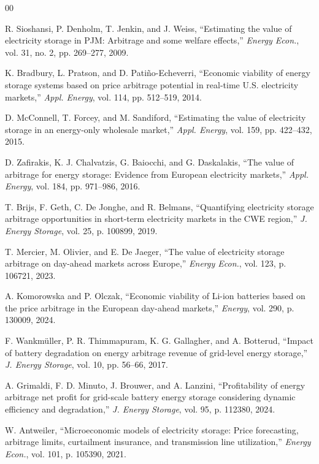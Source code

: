 \documentclass[conference,a4paper]{IEEEtran}
\begin{document}
\begin{thebibliography}{00}

 R. Sioshansi, P. Denholm, T. Jenkin, and J. Weiss, ``Estimating the value of electricity storage in PJM: Arbitrage and some welfare effects,'' \textit{Energy Econ.}, vol. 31, no. 2, pp. 269--277, 2009.

 K. Bradbury, L. Pratson, and D. Pati\~no-Echeverri, ``Economic viability of energy storage systems based on price arbitrage potential in real-time U.S. electricity markets,'' \textit{Appl. Energy}, vol. 114, pp. 512--519, 2014.

 D. McConnell, T. Forcey, and M. Sandiford, ``Estimating the value of electricity storage in an energy-only wholesale market,'' \textit{Appl. Energy}, vol. 159, pp. 422--432, 2015.

 D. Zafirakis, K. J. Chalvatzis, G. Baiocchi, and G. Daskalakis, ``The value of arbitrage for energy storage: Evidence from European electricity markets,'' \textit{Appl. Energy}, vol. 184, pp. 971--986, 2016.

 T. Brijs, F. Geth, C. De Jonghe, and R. Belmans, ``Quantifying electricity storage arbitrage opportunities in short-term electricity markets in the CWE region,'' \textit{J. Energy Storage}, vol. 25, p. 100899, 2019.

 T. Mercier, M. Olivier, and E. De Jaeger, ``The value of electricity storage arbitrage on day-ahead markets across Europe,'' \textit{Energy Econ.}, vol. 123, p. 106721, 2023.

 A. Komorowska and P. Olczak, ``Economic viability of Li-ion batteries based on the price arbitrage in the European day-ahead markets,'' \textit{Energy}, vol. 290, p. 130009, 2024.

 F. Wankm\"uller, P. R. Thimmapuram, K. G. Gallagher, and A. Botterud, ``Impact of battery degradation on energy arbitrage revenue of grid-level energy storage,'' \textit{J. Energy Storage}, vol. 10, pp. 56--66, 2017.

 A. Grimaldi, F. D. Minuto, J. Brouwer, and A. Lanzini, ``Profitability of energy arbitrage net profit for grid-scale battery energy storage considering dynamic efficiency and degradation,'' \textit{J. Energy Storage}, vol. 95, p. 112380, 2024.

 W. Antweiler, ``Microeconomic models of electricity storage: Price forecasting, arbitrage limits, curtailment insurance, and transmission line utilization,'' \textit{Energy Econ.}, vol. 101, p. 105390, 2021.


\end{thebibliography}
\end{document}
